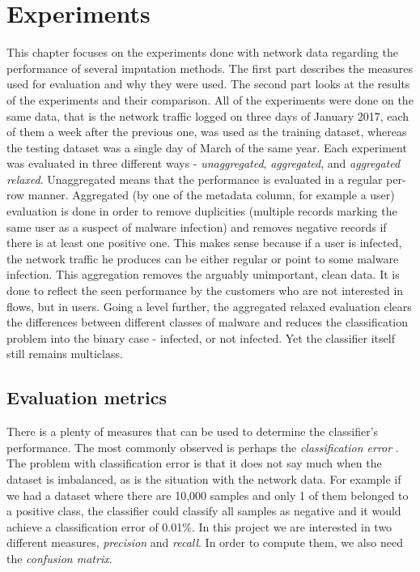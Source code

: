 \documentclass[11pt]{article}
\begin{document}
  \section{Experiments}
    \label{sec:experiments}
    This chapter focuses on the experiments done with network data regarding the performance of several imputation methods. The first part describes the measures used for evaluation and why they were used. The second part looks at the results of the experiments and their comparison. All of the experiments were done on the same data, that is the network traffic logged on three days of January 2017, each of them a week after the previous one, was used as the training dataset, whereas the testing dataset was a single day of March of the same year. Each experiment was evaluated in three different ways - {\it unaggregated}, {\it aggregated}, and {\it aggregated relaxed}. Unaggregated means that the performance is evaluated in a regular per-row manner. Aggregated (by one of the metadata column, for example a user) evaluation is done in order to remove duplicities (multiple records marking the same user as a suspect of malware infection) and removes negative records if there is at least one positive one. This makes sense because if a user is infected, the network traffic he produces can be either regular or point to some malware infection. This aggregation removes the arguably unimportant, clean data. It is done to reflect the seen performance by the customers who are not interested in flows, but in users. Going a level further, the aggregated relaxed evaluation clears the differences between different classes of malware and reduces the classification problem into the binary case - infected, or not infected. Yet the classifier itself still remains multiclass.
    \subsection{Evaluation metrics}
      There is a plenty of measures that can be used to determine the classifier's performance. The most commonly observed is perhaps the {\it classification error} \cite{brabec}. The problem with classification error is that it does not say much when the dataset is imbalanced, as is the situation with the network data. For example if we had a dataset where there are 10,000 samples and only 1 of them belonged to a positive class, the classifier could classify all samples as negative and it would achieve a classification error of 0.01\%. In this project we are interested in two different measures, {\it precision} and {\it recall}. In order to compute them, we also need the {\it confusion matrix}.
\end{document}
